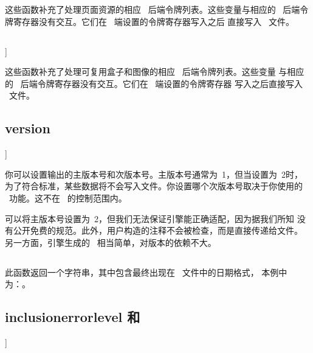 
这些函数补充了处理页面资源的相应 \PDF\ 后端令牌列表。这些变量与相应的
\PDF\ 后端令牌寄存器没有交互。它们在 \TEX\ 端设置的令牌寄存器写入之后
直接写入 \PDF\ 文件。

\subsection{{\type {[set|get}}}]

 
  


这些函数补充了处理可复用盒子和图像的相应 \PDF\ 后端令牌列表。这些变量
与相应的 \PDF\ 后端令牌寄存器没有交互。它们在 \TEX\ 端设置的令牌寄存器
写入之后直接写入 \PDF\ 文件。

\subsection{{\type {[set|get}version}}]


 
 

你可以设置输出的主版本号和次版本号。主版本号通常为~1，但当设置为~2时，
为了符合标准，某些数据将不会写入文件。你设置哪个次版本号取决于你使用的
\PDF\ 功能。这不在 \LUATEX\ 的控制范围内。

可以将主版本号设置为~2，但我们无法保证引擎能正确适配，因为据我们所知
没有公开免费的规范。此外，用户构造的注释不会被检查，而是直接传递给文件。
另一方面，引擎生成的 \PDF\ 相当简单，对版本的依赖不大。

\subsection{}



此函数返回一个字符串，其中包含最终出现在 \PDF\ 文件中的日期格式，
本例中为：{\tttf [版本号]}。

\subsection{{\type {[set|get}inclusionerrorlevel} 和 }]

